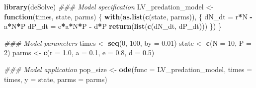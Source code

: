 \documentclass[
]{book}
\newenvironment{Shaded}{\begin{snugshade}}{\end{snugshade}}
\newcommand{\CommentTok}[1]{\textcolor[rgb]{0.56,0.35,0.01}{\textit{#1}}}
\newcommand{\ControlFlowTok}[1]{\textcolor[rgb]{0.13,0.29,0.53}{\textbf{#1}}}
\newcommand{\DataTypeTok}[1]{\textcolor[rgb]{0.13,0.29,0.53}{#1}}
\newcommand{\DecValTok}[1]{\textcolor[rgb]{0.00,0.00,0.81}{#1}}
\newcommand{\FloatTok}[1]{\textcolor[rgb]{0.00,0.00,0.81}{#1}}
\newcommand{\KeywordTok}[1]{\textcolor[rgb]{0.13,0.29,0.53}{\textbf{#1}}}
\newcommand{\NormalTok}[1]{#1}
\newcommand{\OperatorTok}[1]{\textcolor[rgb]{0.81,0.36,0.00}{\textbf{#1}}}
\newcommand{\StringTok}[1]{\textcolor[rgb]{0.31,0.60,0.02}{#1}}
\begin{document}
\begin{Shaded}
\begin{Highlighting}[]
\KeywordTok{library}\NormalTok{(deSolve)}
\CommentTok{### Model specification}
\NormalTok{LV_predation_model <-}\StringTok{ }\ControlFlowTok{function}\NormalTok{(times, state, parms) \{}
  \KeywordTok{with}\NormalTok{(}\KeywordTok{as.list}\NormalTok{(}\KeywordTok{c}\NormalTok{(state, parms)), \{}
\NormalTok{    dN_dt =}\StringTok{ }\NormalTok{r}\OperatorTok{*}\NormalTok{N }\OperatorTok{-}\StringTok{ }\NormalTok{a}\OperatorTok{*}\NormalTok{N}\OperatorTok{*}\NormalTok{P}
\NormalTok{    dP_dt =}\StringTok{ }\NormalTok{e}\OperatorTok{*}\NormalTok{a}\OperatorTok{*}\NormalTok{N}\OperatorTok{*}\NormalTok{P }\OperatorTok{-}\StringTok{ }\NormalTok{d}\OperatorTok{*}\NormalTok{P}
    \KeywordTok{return}\NormalTok{(}\KeywordTok{list}\NormalTok{(}\KeywordTok{c}\NormalTok{(dN_dt, dP_dt)))}
\NormalTok{  \})}
\NormalTok{\}}

\CommentTok{### Model parameters}
\NormalTok{times <-}\StringTok{ }\KeywordTok{seq}\NormalTok{(}\DecValTok{0}\NormalTok{, }\DecValTok{100}\NormalTok{, }\DataTypeTok{by =} \FloatTok{0.01}\NormalTok{)}
\NormalTok{state <-}\StringTok{ }\KeywordTok{c}\NormalTok{(}\DataTypeTok{N =} \DecValTok{10}\NormalTok{, }\DataTypeTok{P =} \DecValTok{2}\NormalTok{)}
\NormalTok{parms <-}\StringTok{ }\KeywordTok{c}\NormalTok{(}\DataTypeTok{r =} \FloatTok{1.0}\NormalTok{, }\DataTypeTok{a =} \FloatTok{0.1}\NormalTok{, }\DataTypeTok{e =} \FloatTok{0.8}\NormalTok{, }\DataTypeTok{d =} \FloatTok{0.5}\NormalTok{)}

\CommentTok{### Model application}
\NormalTok{pop_size <-}\StringTok{ }\KeywordTok{ode}\NormalTok{(}\DataTypeTok{func =}\NormalTok{ LV_predation_model, }\DataTypeTok{times =}\NormalTok{ times, }\DataTypeTok{y =}\NormalTok{ state, }\DataTypeTok{parms =}\NormalTok{ parms)}


\end{Highlighting}
\end{Shaded}
\end{document}
